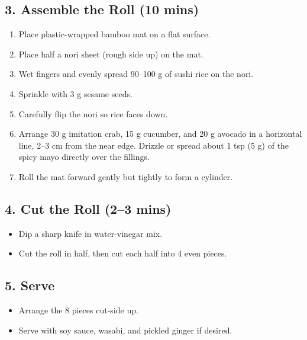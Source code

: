 \documentclass[landscape, a4paper]{article}
\begin{document}
\begin{minipage}[t]{0.31\textwidth}
	\subsection*{3. Assemble the Roll (10 mins)}
	\begin{enumerate}
		\item Place plastic-wrapped bamboo mat on a flat surface.
		\item Place half a nori sheet (rough side up) on the mat.
		\item Wet fingers and evenly spread 90–100 g of sushi rice on the nori.
		\item Sprinkle with 3 g sesame seeds.
		\item Carefully flip the nori so rice faces down.
		\item Arrange 30 g imitation crab, 15 g cucumber, and 20 g avocado in a horizontal line, 2–3 cm from the near edge. Drizzle or spread about 1 tsp (5 g) of the spicy mayo directly over the fillings.
		\item Roll the mat forward gently but tightly to form a cylinder.
	\end{enumerate}

	\subsection*{4. Cut the Roll (2–3 mins)}
	\begin{itemize}
		\item Dip a sharp knife in water-vinegar mix.
		\item Cut the roll in half, then cut each half into 4 even pieces.
	\end{itemize}

	\subsection*{5. Serve}
	\begin{itemize}
		\item Arrange the 8 pieces cut-side up.
		\item Serve with soy sauce, wasabi, and pickled ginger if desired.
	\end{itemize}



\end{minipage}%
\end{document}
